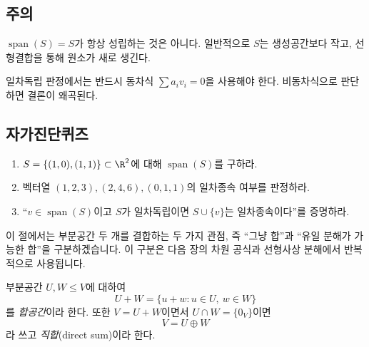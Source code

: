 \subsection*{주의}
\begin{warning}
$\operatorname{span}(S)=S$가 항상 성립하는 것은 아니다. 일반적으로 $S$는 생성공간보다 작고, 선형결합을 통해 원소가 새로 생긴다.
\end{warning}
\begin{warning}
일차독립 판정에서는 반드시 동차식 $\sum a_iv_i=0$을 사용해야 한다. 비동차식으로 판단하면 결론이 왜곡된다.
\end{warning}

\subsection*{자가진단퀴즈}
\begin{enumerate}[label=\arabic*.]
\item $S=\{(1,0),(1,1)\}\subset\R^2$에 대해 $\operatorname{span}(S)$를 구하라.
\item 벡터열 $(1,2,3),(2,4,6),(0,1,1)$의 일차종속 여부를 판정하라.
\item ``$v\in\operatorname{span}(S)$이고 $S$가 일차독립이면 $S\cup\{v\}$는 일차종속이다''를 증명하라.
\end{enumerate}


이 절에서는 부분공간 두 개를 결합하는 두 가지 관점, 즉 ``그냥 합''과 ``유일 분해가 가능한 합''을 구분하겠습니다. 이 구분은 다음 장의 차원 공식과 선형사상 분해에서 반복적으로 사용됩니다.

\begin{definition}
부분공간 $U,W\le V$에 대하여
\[
U+W=\{u+w:u\in U,\ w\in W\}
\]
를 \emph{합공간}이라 한다. 또한 $V=U+W$이면서 $U\cap W=\{0_V\}$이면
\[
V=U\oplus W
\]
라 쓰고 \emph{직합}(direct sum)이라 한다.
\end{definition}

